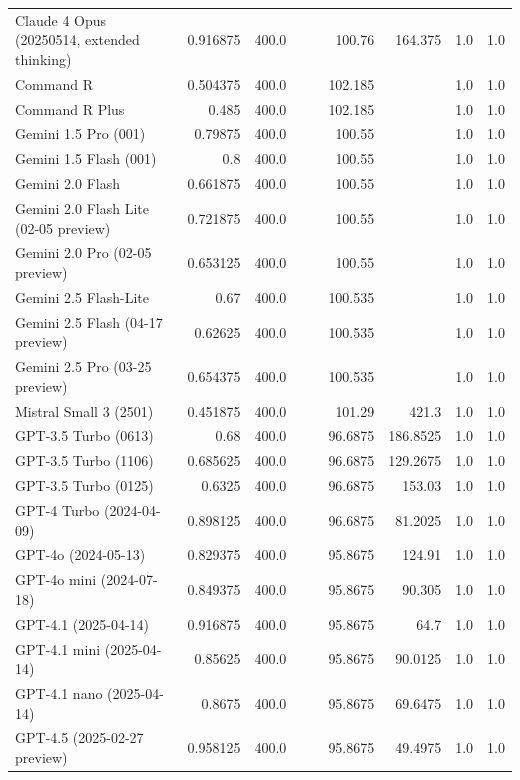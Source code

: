 \begin{table}[htp]
{\begin{tabular}{lrrrrrrrr}
Claude 4 Opus (20250514, extended thinking) & 0.916875 & 400.0 &  &  & 100.76 & 164.375 & 1.0 & 1.0 \\
Command R & 0.504375 & 400.0 &  &  & 102.185 &  & 1.0 & 1.0 \\
Command R Plus & 0.485 & 400.0 &  &  & 102.185 &  & 1.0 & 1.0 \\
Gemini 1.5 Pro (001) & 0.79875 & 400.0 &  &  & 100.55 &  & 1.0 & 1.0 \\
Gemini 1.5 Flash (001) & 0.8 & 400.0 &  &  & 100.55 &  & 1.0 & 1.0 \\
Gemini 2.0 Flash & 0.661875 & 400.0 &  &  & 100.55 &  & 1.0 & 1.0 \\
Gemini 2.0 Flash Lite (02-05 preview) & 0.721875 & 400.0 &  &  & 100.55 &  & 1.0 & 1.0 \\
Gemini 2.0 Pro (02-05 preview) & 0.653125 & 400.0 &  &  & 100.55 &  & 1.0 & 1.0 \\
Gemini 2.5 Flash-Lite & 0.67 & 400.0 &  &  & 100.535 &  & 1.0 & 1.0 \\
Gemini 2.5 Flash (04-17 preview) & 0.62625 & 400.0 &  &  & 100.535 &  & 1.0 & 1.0 \\
Gemini 2.5 Pro (03-25 preview) & 0.654375 & 400.0 &  &  & 100.535 &  & 1.0 & 1.0 \\
Mistral Small 3 (2501) & 0.451875 & 400.0 &  &  & 101.29 & 421.3 & 1.0 & 1.0 \\
GPT-3.5 Turbo (0613) & 0.68 & 400.0 &  &  & 96.6875 & 186.8525 & 1.0 & 1.0 \\
GPT-3.5 Turbo (1106) & 0.685625 & 400.0 &  &  & 96.6875 & 129.2675 & 1.0 & 1.0 \\
GPT-3.5 Turbo (0125) & 0.6325 & 400.0 &  &  & 96.6875 & 153.03 & 1.0 & 1.0 \\
GPT-4 Turbo (2024-04-09) & 0.898125 & 400.0 &  &  & 96.6875 & 81.2025 & 1.0 & 1.0 \\
GPT-4o (2024-05-13) & 0.829375 & 400.0 &  &  & 95.8675 & 124.91 & 1.0 & 1.0 \\
GPT-4o mini (2024-07-18) & 0.849375 & 400.0 &  &  & 95.8675 & 90.305 & 1.0 & 1.0 \\
GPT-4.1 (2025-04-14) & 0.916875 & 400.0 &  &  & 95.8675 & 64.7 & 1.0 & 1.0 \\
GPT-4.1 mini (2025-04-14) & 0.85625 & 400.0 &  &  & 95.8675 & 90.0125 & 1.0 & 1.0 \\
GPT-4.1 nano (2025-04-14) & 0.8675 & 400.0 &  &  & 95.8675 & 69.6475 & 1.0 & 1.0 \\
GPT-4.5 (2025-02-27 preview) & 0.958125 & 400.0 &  &  & 95.8675 & 49.4975 & 1.0 & 1.0 \\

\end{tabular}}
\end{table}
